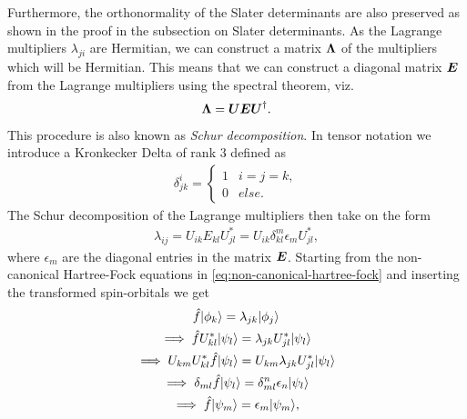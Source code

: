             Furthermore, the orthonormality of the Slater determinants are also
            preserved as shown in the proof in the subsection on Slater determinants.
            As the Lagrange multipliers $\lambda_{ji}$ are Hermitian, we can
            construct a matrix $\boldsymbol{\Lambda}$ of the multipliers which will be
            Hermitian.
            This means that we can construct a diagonal matrix $\boldsymbol{E}$ from
            the Lagrange multipliers using the spectral theorem, viz.
            \begin{align}
                \boldsymbol{\Lambda} = \boldsymbol{U} \boldsymbol{E} \boldsymbol{U}^{\dagger}.
            \end{align}
            This procedure is also known as \emph{Schur decomposition}.
            In tensor notation we introduce a Kronkecker Delta of rank 3 defined as
            \begin{align}
                \delta^{i}_{jk} = \begin{cases}
                    1 & i = j = k, \\
                    0 & else.
                \end{cases}
            \end{align}
            The Schur decomposition of the Lagrange multipliers then take on the
            form
            \begin{align}
                \lambda_{ij} = U_{ik} E_{kl} U^{*}_{jl}
                = U_{ik} \delta^{m}_{kl} \epsilon_{m} U^{*}_{jl},
            \end{align}
            where $\epsilon_m$ are the diagonal entries in the matrix $\boldsymbol{E}$.
            Starting from the non-canonical Hartree-Fock equations in
            \autoref{eq:non-canonical-hartree-fock} and inserting the transformed
            spin-orbitals we get
            \begin{gather}
                \hat{f}| \phi_k \rangle = \lambda_{jk}| \phi_j \rangle
                \\
                \implies
                \hat{f} U^{*}_{kl}| \psi_{l} \rangle = \lambda_{jk} U^{*}_{jl} | \psi_l \rangle
                \\
                \implies
                U_{km} U^{*}_{kl} \hat{f}| \psi_l \rangle
                = U_{km} \lambda_{jk} U^{*}_{jl} | \psi_l \rangle
                \\
                \implies
                \delta_{ml} \hat{f} | \psi_l \rangle
                = \delta^{n}_{ml} \epsilon_{n} | \psi_l \rangle
                \\
                \implies
                \hat{f}| \psi_m \rangle
                = \epsilon_{m} | \psi_m \rangle,
                \label{eq:canonical-hartree-fock}
            \end{gather}
